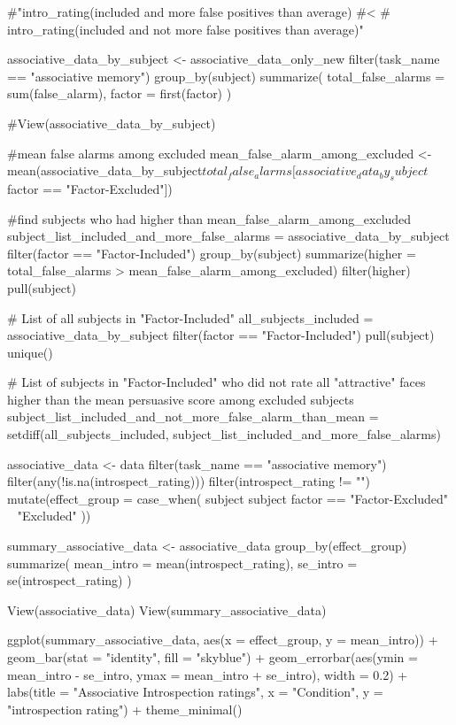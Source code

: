 \documentclass{article}
\begin{document}
#"intro_rating(included and more false positives than average)
#<
#  intro_rating(included and not more false positives than average)"


associative_data_by_subject <- associative_data_only_new %
  filter(task_name == "associative memory") %
  group_by(subject) %
  summarize(
    total_false_alarms = sum(false_alarm),
    factor = first(factor)
    )

#View(associative_data_by_subject)

#mean false alarms among excluded
mean_false_alarm_among_excluded <- mean(associative_data_by_subject$total_false_alarms[associative_data_by_subject$factor == "Factor-Excluded"])

#find subjects who had higher than  mean_false_alarm_among_excluded
subject_list_included_and_more_false_alarms = associative_data_by_subject %
  filter(factor == "Factor-Included") %
  group_by(subject) %
  summarize(higher = total_false_alarms > mean_false_alarm_among_excluded) %
  filter(higher) %
  pull(subject)

# List of all subjects in "Factor-Included"
all_subjects_included = associative_data_by_subject %
  filter(factor == "Factor-Included") %
  pull(subject) %
  unique()

# List of subjects in "Factor-Included" who did not rate all "attractive" faces higher than the mean persuasive score among excluded subjects
subject_list_included_and_not_more_false_alarm_than_mean = setdiff(all_subjects_included, subject_list_included_and_more_false_alarms)


associative_data <- data %
  filter(task_name == "associative memory") %
  filter(any(!is.na(introspect_rating))) %
  filter(introspect_rating != "") %
  mutate(effect_group = case_when(
    subject %
    subject %
    factor == "Factor-Excluded" ~ "Excluded"
  )) 


summary_associative_data <- associative_data %
  group_by(effect_group) %
  summarize(
    mean_intro = mean(introspect_rating),
    se_intro = se(introspect_rating)
  )

View(associative_data)
View(summary_associative_data)

ggplot(summary_associative_data, aes(x = effect_group, y = mean_intro)) +
  geom_bar(stat = "identity", fill = "skyblue") +
  geom_errorbar(aes(ymin = mean_intro - se_intro, ymax = mean_intro + se_intro), width = 0.2) +
  labs(title = "Associative Introspection ratings", x = "Condition", y = "introspection rating") +
  theme_minimal()
\end{document}
